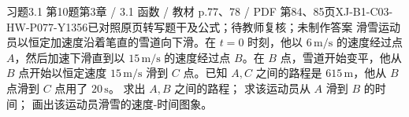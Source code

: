 \par\noindent\begin{minipage}{\linewidth}
\begin{bankitem}{习题3.1 第10题}{第3章 / 3.1 函数 / 教材 p.77、78 / PDF 第84、85页}{XJ-B1-C03-HW-P077-Y1356}{已对照原页转写题干及公式；待教师复核；未制作答案}
滑雪运动员以恒定加速度沿着笔直的雪道向下滑。在 $t=0$ 时刻，他以 $6\,\mathrm{m/s}$ 的速度经过点 $A$，然后加速下滑直到以 $15\,\mathrm{m/s}$ 的速度经过点 $B$。在 $B$ 点，雪道开始变平，他从 $B$ 点开始以恒定速度 $15\,\mathrm{m/s}$ 滑到 $C$ 点。已知 $A,C$ 之间的路程是 $615\,\mathrm m$，他从 $B$ 点滑到 $C$ 点用了 $20\,\mathrm s$。
求出 $A,B$ 之间的路程；
求该运动员从 $A$ 滑到 $B$ 的时间；
画出该运动员滑雪的速度-时间图象。
\end{bankitem}
\end{minipage}\par\medskip
